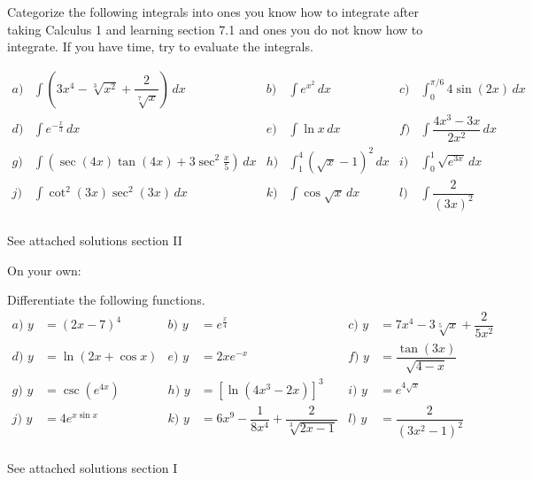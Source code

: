 \documentclass[noinstructornotes]{ximera}
\begin{document}
\begin{problem}
Categorize the following integrals into ones you know how to integrate after taking Calculus 1 and learning section 7.1 and ones you do not know how to integrate.  If you have time, try to evaluate the integrals.

\begin{align*}
a) & \int \left(3x^4-\sqrt[3]{x^2} + \dfrac{2}{\sqrt[7]{x}}\right)  \, dx  & b) & \int e^{x^2} \, dx & c) & \int^{\pi/6}_{0} 4 \sin(2x) \, dx  \\
d) & \int e^{-\frac{x}{3}} \, dx  & e) & \int \ln x \, dx & f) & \int \dfrac{4x^3-3x}{2x^2} \, dx  \\
g) & \int \left( \sec(4x) \tan(4x) + 3 \sec^2 \frac{x}{5} \right) \, dx  & h) & \int^4_1 (\sqrt{x}-1)^2 \, dx  & i) & \int_0^1 \sqrt{e^{3x}} \, dx  \\
j) &\int \cot^2 (3x) \sec^2 (3x) \, dx & k) & \int \cos \sqrt{x} \, dx & l) & \int \dfrac{2}{(3x)^2} \\
\end{align*}
			
	\begin{freeResponse}		
	See attached solutions section II
	\end{freeResponse}
		
\end{problem}

On your own:
\begin{problem}

Differentiate the following functions.
\begin{align*}
a)  \, \, y &= (2x-7)^4  & b) \, \, y &=  e^{\frac{x}{4}} & c) \, \, y&= 7x^4-3\sqrt[5]{x} + \dfrac{2}{5x^2} \\
d) \, \, y&= \ln(2x+\cos x) & e) \, \, y&=2xe^{-x} & f) \, \, y&= \dfrac{\tan{(3x)}}{\sqrt{4-x}} \\
g) \, \, y&= \csc{\left(e^{4x}\right)} & h) \, \, y&= [\ln(4x^3-2x)]^3 & i) \, \, y&= e^{4 \sqrt{x}} \\
j) \, \, y&=4e^{x \sin x} & k) \, \, y&= 6x^9-\dfrac{1}{8x^4}+\dfrac{2}{\sqrt[3]{2x-1}} & l) \, \, y &=\dfrac{2}{(3x^2-1)^2} \\
\end{align*}

	\begin{freeResponse}		
	See attached solutions section I
	\end{freeResponse}


	
\end{problem}
\end{document}
